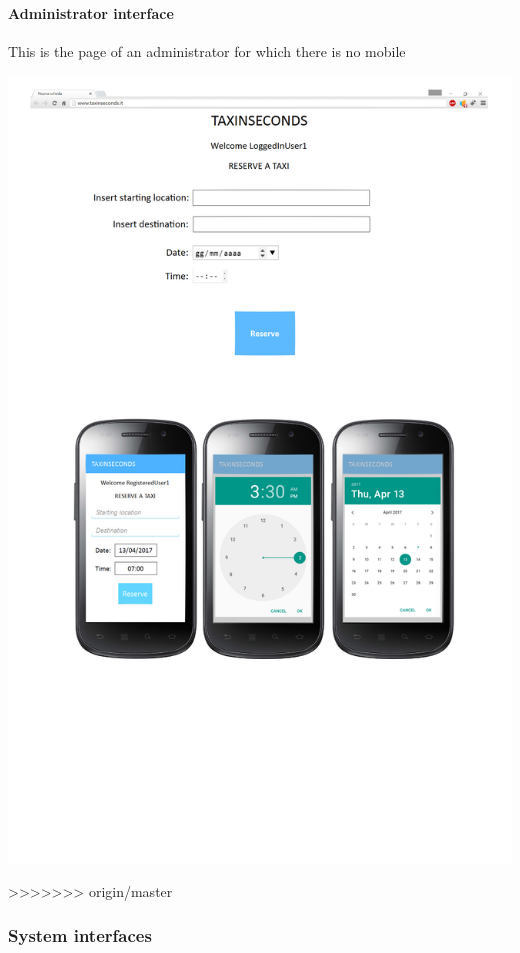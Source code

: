 \documentclass{article}
\begin{document}
\paragraph{Administrator interface}
This is the page of an administrator for which there is no mobile\\ 
\begin{center}
	\includegraphics[width=.8\textwidth,height=.8\textheight,keepaspectratio]{ReserveTaxi}
\end{center}
>>>>>>> origin/master
\clearpage
\subsubsection{System interfaces}
 %
\end{document}
